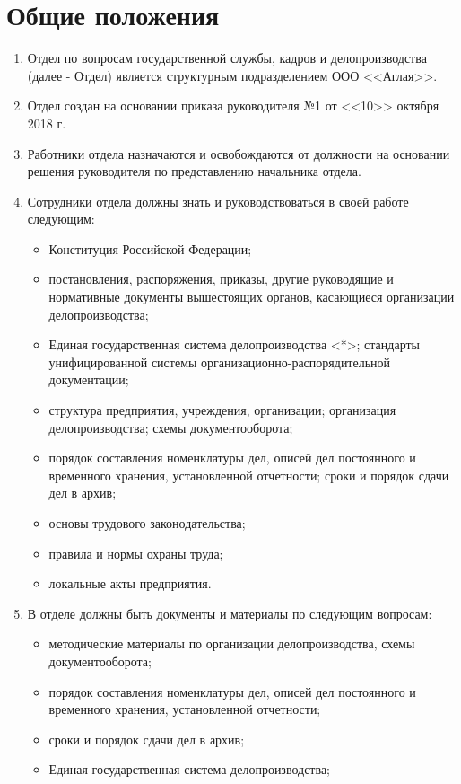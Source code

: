 \documentclass[a4paper,12pt]{article}
\begin{document}
\section{Общие положения}
\begin{enumerate}
	\item Отдел по вопросам государственной службы, кадров и делопроизводства (далее - Отдел) является структурным подразделением ООО <<Аглая>>.
	\item Отдел создан на основании приказа руководителя №1 от <<10>> октября 2018 г.
	\item Работники отдела назначаются и освобождаются от должности на основании решения руководителя по представлению начальника отдела.
	\item Сотрудники отдела должны знать и руководствоваться в своей работе следующим:
	\begin{itemize}
		\item Конституция Российской Федерации;
		\item постановления, распоряжения, приказы, другие руководящие и нормативные документы вышестоящих органов, касающиеся организации делопроизводства;
		\item Единая государственная система делопроизводства <*>; стандарты унифицированной системы организационно-распорядительной документации;
		\item структура предприятия, учреждения, организации; организация делопроизводства; схемы документооборота;
		\item порядок составления номенклатуры дел, описей дел постоянного и временного хранения, установленной отчетности; сроки и порядок сдачи дел в архив;
		\item основы трудового законодательства;
		\item правила и нормы охраны труда;
		\item локальные акты предприятия.
	\end{itemize}
\item В отделе должны быть документы и материалы по следующим вопросам:
\begin{itemize}
	\item методические материалы по организации делопроизводства, схемы документооборота;
	\item порядок составления номенклатуры дел, описей дел постоянного и временного хранения, установленной отчетности;
	\item сроки и порядок сдачи дел в архив;
	\item Единая государственная система делопроизводства;

\end{itemize}
\end{enumerate}
\end{document}
